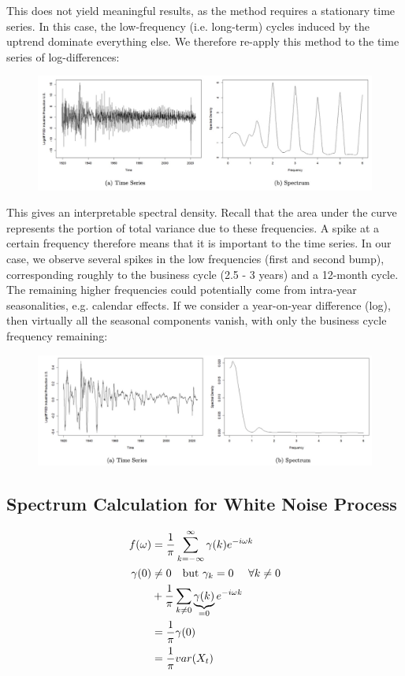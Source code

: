 This does not yield meaningful results, as the method requires a stationary time series. In this case, the low-frequency (i.e. long-term) cycles induced by the uptrend dominate everything else. We therefore re-apply this method to the time series of log-differences: 

\begin{figure}[H]
\includegraphics[scale=0.4]{images/Screenshot 2024-05-06 at 10.39.09.jpg}
\centering
\end{figure}

This gives an interpretable spectral density. Recall that the area under the curve represents the portion of total variance due to these frequencies. A spike at a certain frequency therefore means that it is important to the time series. In our case, we observe several spikes in the low frequencies (first and second bump), corresponding roughly to the business cycle (2.5 - 3 years) and a 12-month cycle. The remaining higher frequencies could potentially come from intra-year seasonalities, e.g. calendar effects. If we consider a year-on-year difference (log), then virtually all the seasonal components vanish, with only the business cycle frequency remaining: 
\begin{figure}[H]
\includegraphics[scale=0.4]{images/Screenshot 2024-05-06 at 10.41.41.jpg}
\centering
\end{figure}




\subsection{Spectrum Calculation for White Noise Process}
\begin{align*}
    f(\omega)&=\frac{1}{\pi} \sum_{k=-\infty}^\infty \gamma(k) e^{-i\omega k}\\
    \gamma(0) & \neq 0 \quad \text{but $\gamma_k = 0$ \quad $\forall k\neq0$} \\
    &+ \frac{1}{\pi} \sum_{k\neq 0} \underbrace{\gamma(k)}_{=0} e^{-i\omega k} \\
    &= \frac{1}{\pi} \gamma(0)\\
    &= \frac{1}{\pi}var(X_t)
\end{align*}

